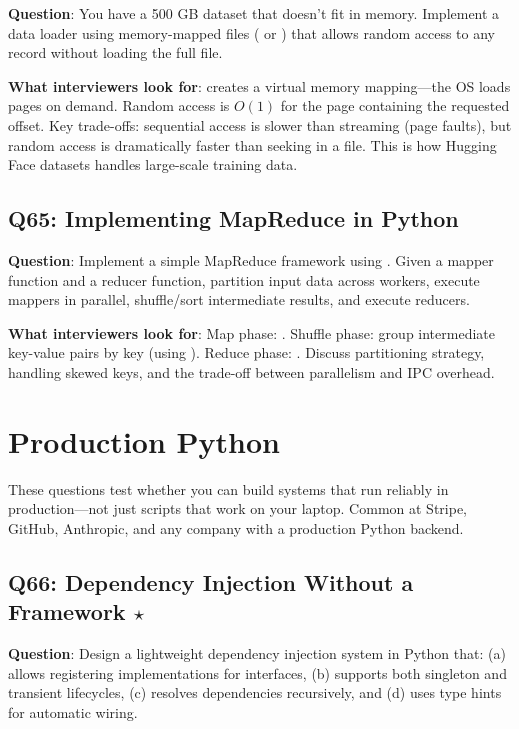 \textbf{Question}: You have a 500 GB dataset that doesn't fit in memory. Implement a data loader using memory-mapped files ( or ) that allows random access to any record without loading the full file.

\textbf{What interviewers look for}:  creates a virtual memory mapping---the OS loads pages on demand. Random access is $O(1)$ for the page containing the requested offset. Key trade-offs: sequential access is slower than streaming (page faults), but random access is dramatically faster than seeking in a file. This is how Hugging Face datasets handles large-scale training data.

\subsection{Q65: Implementing MapReduce in Python}

\textbf{Question}: Implement a simple MapReduce framework using . Given a mapper function and a reducer function, partition input data across workers, execute mappers in parallel, shuffle/sort intermediate results, and execute reducers.

\textbf{What interviewers look for}: Map phase: . Shuffle phase: group intermediate key-value pairs by key (using ). Reduce phase: . Discuss partitioning strategy, handling skewed keys, and the trade-off between parallelism and IPC overhead.


\section{Production Python}

These questions test whether you can build systems that run reliably in production---not just scripts that work on your laptop. Common at Stripe, GitHub, Anthropic, and any company with a production Python backend.

\subsection{Q66: Dependency Injection Without a Framework $\star$}

\textbf{Question}: Design a lightweight dependency injection system in Python that: (a) allows registering implementations for interfaces, (b) supports both singleton and transient lifecycles, (c) resolves dependencies recursively, and (d) uses type hints for automatic wiring.

